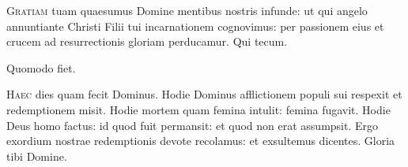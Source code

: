 \lettrine{G}{ratiam} tuam quaesumus Domine
mentibus nostris infunde:
ut qui angelo annuntiante
Christi Filii tui incarnationem cognovimus:
per passionem eius et crucem
ad resurrectionis gloriam perducamur.
Qui tecum.


\vspace{2mm}

Quomodo fiet.

\lettrine{H}{aec} dies quam fecit Dominus.
Hodie Dominus afflictionem populi sui respexit
et redemptionem misit.
Hodie mortem quam femina intulit: femina fugavit.
Hodie Deus homo factus:
id quod fuit permansit: et quod non erat assumpsit.
Ergo exordium nostrae redemptionis devote recolamus:
et exsultemus dicentes.
Gloria tibi Domine.


\headingCantus




